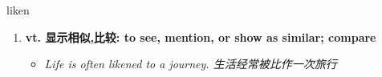 
\begin{frame}
{\huge liken}
\begin{center}
\begin{enumerate}\Large
  \item \textbf{vt. 显示相似,比较: to see, mention, or show as similar; compare}
  \begin{itemize}
    \item \em{\Large{Life is often likened to a journey. 生活经常被比作一次旅行}}
  \end{itemize}
\end{enumerate}
\end{center}
\end{frame}
